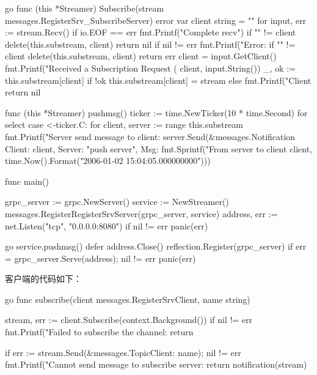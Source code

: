 \begin{outline}[enumerate]
\begin{code-in-enumerate}{go}
func (this *Streamer) Subscribe(stream messages.RegisterSrv_SubscribeServer) error {
    var client string = ""
    for {
        input, err := stream.Recv()
        if io.EOF == err {
            fmt.Printf("Complete recv\n")
            if "" != client {
                delete(this.substream, client)
            }
            return nil
        }
        if nil != err {
            fmt.Printf("Error: %
            if "" != client {
                delete(this.substream, client)
            }
            return err
        }
        client = input.GetClient()
        fmt.Printf("Received a Subscription Request (%
            client, input.String())
        _, ok := this.substream[client]
        if !ok {
            this.substream[client] = stream
        } else {
            fmt.Printf("Client %
        }
    }
    return nil
}

func (this *Streamer) pushmsg() {
    ticker := time.NewTicker(10 * time.Second)
    for {
        select {
        case <-ticker.C:
            for client, server := range this.substream {
                fmt.Printf("Server send message to client:%
                    server.Send(&messages.Notification{
                        Client: client, Server: "push server",
                        Msg: fmt.Sprintf("From server to client %
                    client, time.Now().Format("2006-01-02 15:04:05.000000000"))})
            }
        }
    }
}

func main() {
    grpc_server := grpc.NewServer()
    service := NewStreamer()
    messages.RegisterRegisterSrvServer(grpc_server, service)
    address, err := net.Listen("tcp", "0.0.0.0:8080")
    if nil != err {
        panic(err)
    }

    go service.pushmsg()
    defer address.Close()
    reflection.Register(grpc_server)
    if err = grpc_server.Serve(address); nil != err {
        panic(err)
    }
}
\end{code-in-enumerate}

  客户端的代码如下：
\begin{code-in-enumerate}{go}
func subscribe(client messages.RegisterSrvClient, name string) {
    stream, err := client.Subscribe(context.Background())
    if nil != err {
        fmt.Printf("Failed to subscribe the channel:%
        return
    }

    if err := stream.Send(&messages.Topic{Client: name}); nil != err {
        fmt.Printf("Cannot send message to subscribe server:%
        return
    }
    notification(stream)
}


\end{code-in-enumerate}
\end{outline}
